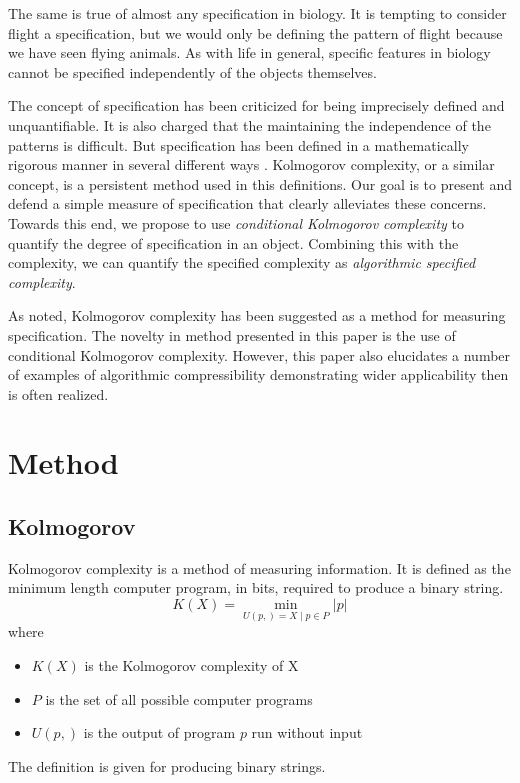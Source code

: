 The same is true of almost any specification in biology.
It is tempting to consider flight a specification, but we would only be defining the pattern of flight because we have seen flying animals.
As with life in general, specific features in biology cannot be specified independently of the objects themselves.

The concept of specification has been criticized for being imprecisely defined and unquantifiable.
It is also charged that the maintaining the independence of the patterns is difficult.
But specification has been defined in a mathematically rigorous manner in several different ways \citep{Dembski1998, Dembski2002, Dembski2005a}.
Kolmogorov complexity, or a similar concept, is a persistent method used in this definitions.
Our goal is to present and defend a simple measure of specification that clearly alleviates these concerns.
Towards this end, we propose to use \textit{conditional Kolmogorov complexity} to quantify the degree of specification in an object.
Combining this with the complexity, we can quantify the specified complexity as \textit{algorithmic specified complexity}.

As noted, Kolmogorov complexity has been suggested as a method for measuring specification.
The novelty in method presented in this paper is the use of conditional Kolmogorov complexity.
However, this paper also elucidates a number of examples of algorithmic compressibility demonstrating wider applicability then is often realized.

\section{Method}

\subsection{Kolmogorov}

Kolmogorov complexity is a method of measuring information.
It is defined as the minimum length computer program, in bits, required to produce a binary string.
\begin{equation}
    K(X) = \min_{U(p,) = X \mid p \in P} |p|
\end{equation} where
\begin{itemize}
    \item $K(X)$ is the Kolmogorov complexity of X
    \item $P$ is the set of all possible computer programs
    \item $U(p,)$ is the output of program $p$ run without input
\end{itemize}
The definition is given for producing binary strings.


